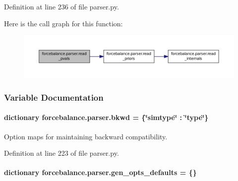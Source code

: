 Definition at line 236 of file parser.\-py.



Here is the call graph for this function\-:\nopagebreak
\begin{figure}[H]
\begin{center}
\leavevmode
\includegraphics[width=350pt]{namespaceforcebalance_1_1parser_a56fb1e139dad24bac29f25a3870765ca_cgraph}
\end{center}
\end{figure}




\subsubsection{Variable Documentation}
\hypertarget{namespaceforcebalance_1_1parser_a121eaaef101563523a8fb20bd5ace409}{
\paragraph[{bkwd}]{\setlength{\rightskip}{0pt plus 5cm}dictionary forcebalance.\-parser.\-bkwd = \{\char`\"{}simtype\char`\"{} \-: \char`\"{}type\char`\"{}\}}}\label{namespaceforcebalance_1_1parser_a121eaaef101563523a8fb20bd5ace409}


Option maps for maintaining backward compatibility. 



Definition at line 223 of file parser.\-py.

\hypertarget{namespaceforcebalance_1_1parser_a980fd024b1f2877247de482247250b9e}{
\paragraph[{gen\-\_\-opts\-\_\-defaults}]{\setlength{\rightskip}{0pt plus 5cm}dictionary forcebalance.\-parser.\-gen\-\_\-opts\-\_\-defaults = \{\}}}\label{namespaceforcebalance_1_1parser_a980fd024b1f2877247de482247250b9e}


